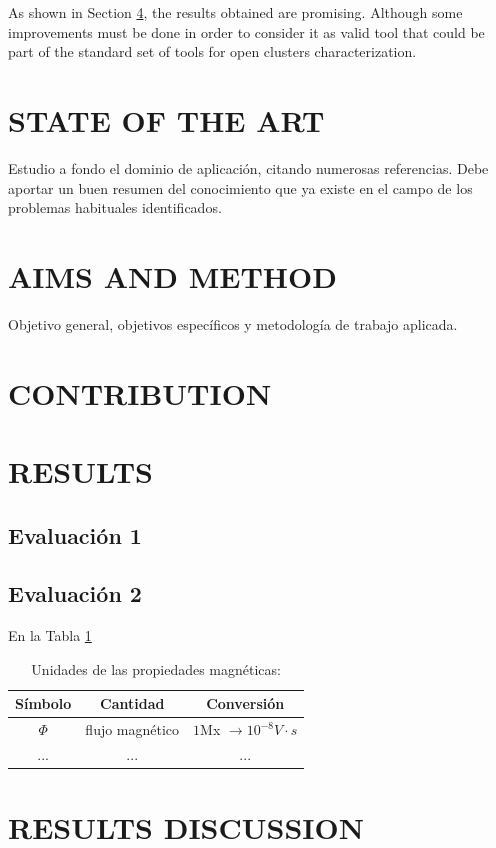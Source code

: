 \documentclass[11pt,a4paper,USenglish,twocolumn]{article}
\begin{document}
As shown in Section \ref{sec:results}, the results obtained are promising.
Although some improvements must be done in order to consider it as valid tool
that could be part of the standard set of tools for open clusters characterization.

\section{STATE OF THE ART}

Estudio a fondo el dominio de aplicación, citando numerosas referencias.
Debe aportar un buen resumen del conocimiento que ya existe en el campo de los problemas habituales identificados.
\section{AIMS AND METHOD}

Objetivo general, objetivos específicos y metodología de trabajo aplicada.

\section{CONTRIBUTION}

\section{RESULTS}
\label{sec:results}

\subsection{Evaluación 1}

\subsection{Evaluación 2 }
En la Tabla \ref{tab_1}
\begin{table}\label{tab_1}
\caption{Unidades de las propiedades magnéticas:}

\begin{tabular}{ccc}\hline\hline
Símbolo & Cantidad & Conversión\\
\hline
$\Phi$ & flujo magnético & $1$Mx $\rightarrow 10^{-8}V\cdot s$\\
... &...&...\\
\hline\hline
\end{tabular}
\end{table}

\section{RESULTS DISCUSSION}
\end{document}
